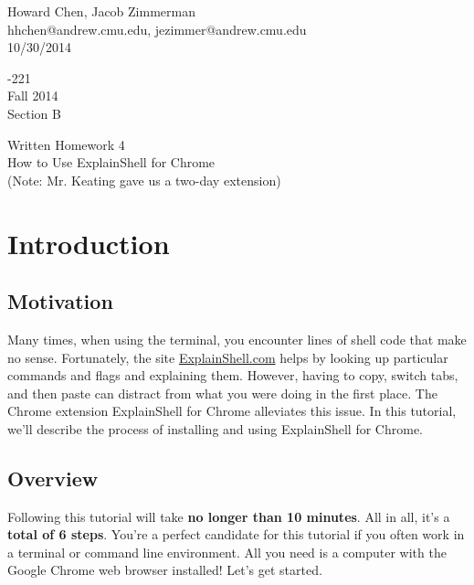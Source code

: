 \documentclass[11pt]{article}
\begin{document}
\thispagestyle{empty}
\noindent
\begin{minipage}[width=0.7\linewidth]{0.7\linewidth}
  Howard Chen, Jacob Zimmerman\\
  hhchen@andrew.cmu.edu, jezimmer@andrew.cmu.edu\\
  10/30/2014
\end{minipage}
\hfill
\begin{minipage}[width=0.3\linewidth]{0.3\linewidth}
  -221\\
  Fall 2014\\
  Section B
\end{minipage}

\begin{center}
  Written Homework 4\\
  How to Use ExplainShell for Chrome\\
  (Note: Mr. Keating gave us a two-day extension)
\end{center}
\newpage

\tableofcontents

\newpage

\section{Introduction}

\subsection{Motivation}
Many times, when using the terminal, you encounter lines of shell code that make no sense. Fortunately, the site \href{http://explainshell.com/}{ExplainShell.com} helps by looking up particular commands and flags and explaining them. However, having to copy, switch tabs, and then paste can distract from what you were doing in the first place. The Chrome extension ExplainShell for Chrome alleviates this issue. In this tutorial, we'll describe the process of installing and using ExplainShell for Chrome.


\subsection{Overview}
Following this tutorial will take \textbf{no longer than 10 minutes}. All in all, it's a \textbf{total of 6 steps}. You're a perfect candidate for this tutorial if you often work in a terminal or command line environment. All you need is a computer with the Google Chrome web browser installed! Let's get started.
\end{document}

